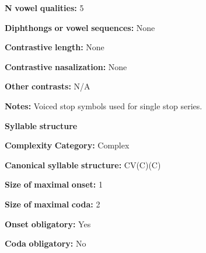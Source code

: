 \documentclass[output=paper]{langsci/langscibook}
\begin{document}
\begin{styleBody}
\textbf{N} \textbf{vowel} \textbf{qualities:} 5
\end{styleBody}

\begin{styleBody}
\textbf{Diphthongs} \textbf{or} \textbf{vowel} \textbf{sequences:} None
\end{styleBody}

\begin{styleBody}
\textbf{Contrastive} \textbf{length:} None
\end{styleBody}

\begin{styleBody}
\textbf{Contrastive} \textbf{nasalization:} None
\end{styleBody}

\begin{styleBody}
\textbf{Other} \textbf{contrasts:} N/A
\end{styleBody}

\begin{styleBody}
\textbf{Notes:} Voiced stop symbols used for single stop series.
\end{styleBody}

\begin{styleBody}
\textbf{Syllable} \textbf{structure}
\end{styleBody}

\begin{styleBody}
\textbf{Complexity} \textbf{Category:} Complex
\end{styleBody}

\begin{styleBody}
\textbf{Canonical} \textbf{syllable} \textbf{structure:} CV(C)(C) \citep[186-96]{Merlan1989}
\end{styleBody}

\begin{styleBody}
\textbf{Size} \textbf{of} \textbf{maximal} \textbf{onset:} 1
\end{styleBody}

\begin{styleBody}
\textbf{Size} \textbf{of} \textbf{maximal} \textbf{coda:} 2
\end{styleBody}

\begin{styleBody}
\textbf{Onset} \textbf{obligatory:} Yes
\end{styleBody}

\begin{styleBody}
\textbf{Coda} \textbf{obligatory:} No
\end{styleBody}
\end{document}
